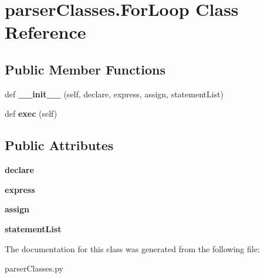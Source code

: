 \hypertarget{classparser_classes_1_1_for_loop}{}\section{parser\+Classes.\+For\+Loop Class Reference}
\label{classparser_classes_1_1_for_loop}
\subsection*{Public Member Functions}
\begin{DoxyCompactItemize}
\item 
\mbox{\label{classparser_classes_1_1_for_loop_a493415116c52fd7fa290ea6a690a14a9}} 
def {\bfseries \+\_\+\+\_\+init\+\_\+\+\_\+} (self, declare, express, assign, statement\+List)
\item 
\mbox{\label{classparser_classes_1_1_for_loop_ad3137f5077049d1ec6c6237ede82fb00}} 
def {\bfseries exec} (self)
\end{DoxyCompactItemize}
\subsection*{Public Attributes}
\begin{DoxyCompactItemize}
\item 
\mbox{\label{classparser_classes_1_1_for_loop_a65197911c246be2c9f668ae4d41fe4d8}} 
{\bfseries declare}
\item 
\mbox{\label{classparser_classes_1_1_for_loop_a8ae2f63e3678abacad591c63921f3181}} 
{\bfseries express}
\item 
\mbox{\label{classparser_classes_1_1_for_loop_a178c81dcf1d041491a8b54f901bf9059}} 
{\bfseries assign}
\item 
\mbox{\label{classparser_classes_1_1_for_loop_ac776ecf176b1bbead46bb6a2e9061668}} 
{\bfseries statement\+List}
\end{DoxyCompactItemize}


The documentation for this class was generated from the following file\+:\begin{DoxyCompactItemize}
\item 
parser\+Classes.\+py\end{DoxyCompactItemize}
